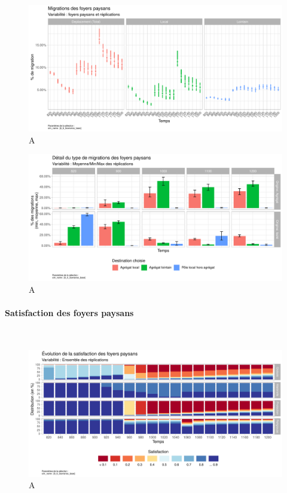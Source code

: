 \begin{figure}[H]
	\centering
	\includegraphics[width=\linewidth]{img/results_6_6/FP_TypeDeplacements_Haut.pdf}
	\caption{A}
	\label{}
\end{figure}
\begin{figure}[H]
	\centering
	\includegraphics[width=\linewidth]{img/results_6_6/FP_DeplacementsDetail_Haut.pdf}
	\caption{A}
	\label{}
\end{figure}


\paragraph{Satisfaction des foyers paysans}~\\

\begin{figure}[H]
	\centering
	\includegraphics[width=\linewidth]{img/results_6_6/FP_Satisfaction_Haut.pdf}
	\caption{A}
	\label{fig:result-fp-satis}
\end{figure}
